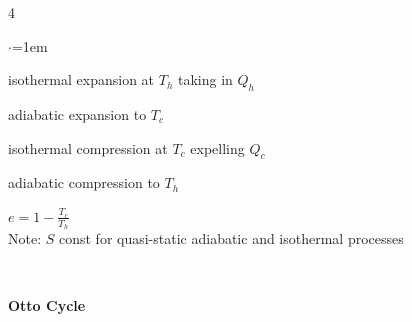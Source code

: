 \documentclass[letterpaper,landscape,10pt]{article}
\newenvironment{titemize}
{\begin{list}{$\cdot$}{\leftmargin=1em}
	\setlength{\itemsep}{0pt}
	\setlength{\parskip}{0pt}
	\setlength{\parsep}{0pt}}
{\end{list}}
\begin{document}
{\begin{multicols}{4}
\begin{minipage}{\columnwidth}
	  \begin{minipage}{0.24\columnwidth}
	  \end{minipage}\hspace{.01\columnwidth}
	  \begin{minipage}{0.74\columnwidth}
		  \begin{titemize}
			  \item[1)] isothermal expansion at $T_h$ taking in $Q_h$
			  \item[2)] adiabatic expansion to $T_c$
			  \item[3)] isothermal compression at $T_c$ expelling $Q_c$
			  \item[4)] adiabatic compression to $T_h$
		  \end{titemize}
		$e = 1-\frac{T_c}{T_h}$ \\
		Note: $S$ const for quasi-static adiabatic and isothermal processes
	  \end{minipage}\\
	\end{minipage}
	  \vspace{5pt}
	  \begin{minipage}{\columnwidth}
	\textbf{Otto Cycle} \\
	  \begin{minipage}{0.24\columnwidth}

\end{minipage}
\end{minipage}
\end{multicols}}
\end{document}
